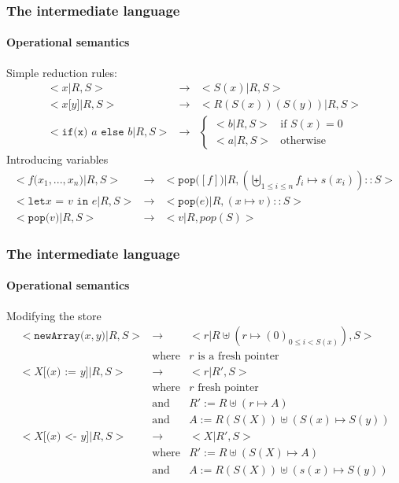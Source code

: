 \documentclass{beamer}
\newcommand{\cl}[1]{\texttt{#1}}
\begin{document}
\begin{frame}
\frametitle{The intermediate language}
\framesubtitle{Operational semantics}
Simple reduction rules:
\begin{eqnarray*}
<x | R, S> &\rightarrow& < S(x)|R,S> \\
<x \cl{[} y \cl{]} | R, S> &\rightarrow & < R(S(x))(S(y))|R,S> \\
<\cl{if(x) } a \cl{ else } b |R,S> &\rightarrow&
\left\lbrace \begin{array}{ll}
<b|R,S> & \text{if } S(x) = 0 \\
<a|R,S> & \text{otherwise}
\end{array} \right.
\end{eqnarray*}
Introducing variables
\begin{eqnarray*}
<f\cl{(} x_1, ... , x_n \cl{)} | R, S> &\rightarrow& < \cl{pop(} [f] \cl{)} | R, \left( \biguplus_{1 \leq i \leq n} f_i \mapsto s(x_i) \right) :: S > \\
<\cl{let} x \cl{ = } v \cl{ in } e | R, S> &\rightarrow& < \cl{pop(}e\cl{)}|R, (x \mapsto v) :: S > \\
<\cl{pop(} v \cl{)} | R, S> &\rightarrow& <v | R, pop(S) >
\end{eqnarray*}
\end{frame}



\begin{frame}
\frametitle{The intermediate language}
\framesubtitle{Operational semantics}
Modifying the store
\begin{eqnarray*}
<\cl{newArray(} x, y \cl{)} | R, S> &\rightarrow& <r| R\uplus \left( r \mapsto (0)_{0 \leq i < S(x)} \right), S> \\
&\text{where}& r \text{ is a fresh pointer} \\
< X \cl{[(} x \cl{) := } y \cl{]} | R, S> &\rightarrow& < r| R', S> \\
&\text{where}& r \text{ fresh pointer} \\
&\text{and}& R' := R \uplus \left( r \mapsto A \right) \\
&\text{and}& A  := R( S(X) ) \uplus \left( S(x) \mapsto S(y) \right) \\
< X \cl{[(} x \cl{) <- } y \cl{]} | R, S> &\rightarrow& < X| R', S> \\
&\text{where}& R' := R \uplus \left( S(X) \mapsto A \right) \\
&\text{and}&   A  := R( S(X) ) \uplus \left( s(x) \mapsto S(y) \right)
\end{eqnarray*}
\end{frame}
\end{document}
